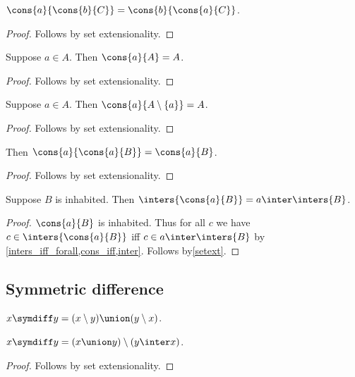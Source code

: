 \begin{proposition}\label{cons_comm}
    $\cons{a}{\cons{b}{C}} = \cons{b}{\cons{a}{C}}$.
\end{proposition}
\begin{proof}
    Follows by set extensionality.
\end{proof}

\begin{proposition}\label{cons_absorb}
    Suppose $a\in A$.
    Then $\cons{a}{A} = A$.
\end{proposition}
\begin{proof}
    Follows by set extensionality.
\end{proof}

\begin{proposition}\label{cons_remove}
    Suppose $a\in A$.
    Then $\cons{a}{A\setminus\{a\}} = A$.
\end{proposition}
\begin{proof}
    Follows by set extensionality.
\end{proof}

\begin{proposition}\label{cons_idempotent}
    Then $\cons{a}{\cons{a}{B}} = \cons{a}{B}$.
\end{proposition}
\begin{proof}
    Follows by set extensionality.
\end{proof}

\begin{proposition}\label{inters_cons}
    Suppose $B$ is inhabited.
    Then $\inters{\cons{a}{B}} = a\inter\inters{B}$.
\end{proposition}
\begin{proof}
    $\cons{a}{B}$ is inhabited.
    Thus for all $c$ we have $c\in\inters{\cons{a}{B}}$ iff $c\in a\inter \inters{B}$
        by \cref{inters_iff_forall,cons_iff,inter}.
    Follows by\cref{setext}.
\end{proof}\subsection{Symmetric difference}


\begin{definition}\label{symdiff}
    $x\symdiff y = (x\setminus y)\union (y\setminus x)$.
\end{definition}

\begin{proposition}%
\label{symdiff_as_setdiff}
    $x\symdiff y = (x\union y)\setminus (y\inter x)$.
\end{proposition}
\begin{proof}
    Follows by set extensionality.
\end{proof}

